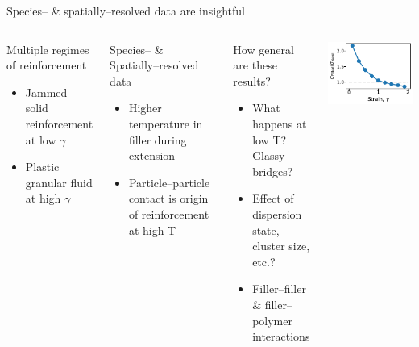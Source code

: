\documentclass[aspectratio=169,xcolor=table]{beamer}
\begin{document}
\begin{frame}{Species-- \& spatially--resolved data are insightful}
  \begin{columns}[T]

  \centering

  \begin{block}{Multiple regimes of reinforcement}
  \begin{itemize}
    \item Jammed solid reinforcement at low $\gamma$
    \item Plastic granular fluid at high $\gamma$
  \end{itemize}
  \end{block}

  \begin{block}{Species-- \& Spatially--resolved data}
  \begin{itemize}
    \item Higher temperature in filler during extension
    \item Particle--particle contact is origin of reinforcement at high T
  \end{itemize}
  \end{block}

  \begin{block}{How general are these results?}
  \begin{itemize}
    \item What happens at low T? Glassy bridges?
    \item Effect of dispersion state, cluster size, etc.?
    \item Filler--filler \& filler--polymer interactions
  \end{itemize}
  \end{block}

  \centering

  \includegraphics[]{../figures/fig-stress_vs_shear/fig-stress_vs_shear.ratio.pdf}


\end{columns}
\end{frame}
\end{document}

